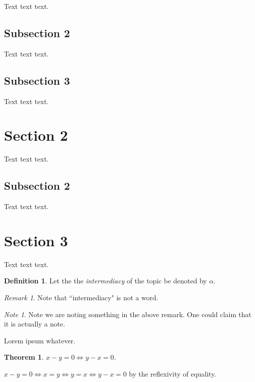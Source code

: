 \documentclass[twoside, titlepage]{amsbook}
\makeatletter
\theoremstyle{plain} %
\newtheorem{thm}{Theorem}[section]
\theoremstyle{definition}
\newtheorem{defn}{Definition}[section]
\theoremstyle{remark}
\newtheorem*{rem}{Remark}
\newtheorem*{note}{Note}
\theoremstyle{notation}
\renewenvironment{proof}[1][\proofname]{\par
	\pushQED{\qed}%
	\normalfont \topsep6\p@\@plus6\p@\relax
	\trivlist
	\item\relax
	{\itshape
		#1\@addpunct{.}}\hspace\labelsep\ignorespaces
}{%
\popQED\endtrivlist\@endpefalse
}
\makeatother
\begin{document}
					Text text text.
			
			\subsection{Subsection 2}
			
				Text text text.
			
			\subsection{Subsection 3}
			
				Text text text.
		
		\section{Section 2}
		
			Text text text.
			
			\subsection{Subsection 2}
			
				Text text text.
		
		\section{Section 3}
		
			Text text text.  
			
			\begin{defn}
				Let the the \emph{intermediacy} of the topic be denoted by $\alpha$.
			\end{defn}
			
			\begin{rem}
				Note that ``intermediacy" is not a word.
			\end{rem}
			
			\begin{note}
				Note we are noting something in the above remark.  One could claim that it is actually a note.
			\end{note}
			
			Lorem ipsum whatever.
			
			\begin{thm}
				$x - y = 0 \iff y - x = 0$.
			\end{thm}
			\begin{proof}
				$x - y = 0 \iff x = y \iff y = x \iff y - x = 0$ by the reflexivity of equality.
			\end{proof}
			
\end{document}
